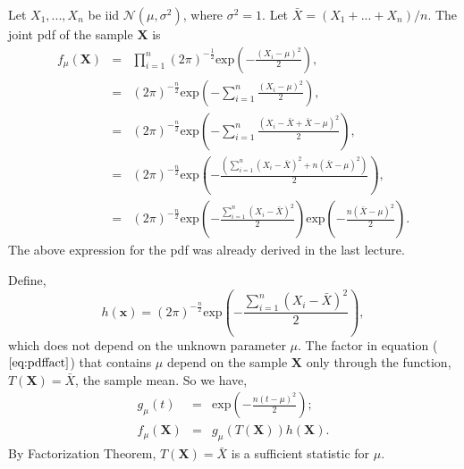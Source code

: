 \documentclass[a4paper,english,12pt]{article}
\newcommand{\bx}{\mathbf{x}}
\newcommand{\bX}{\mathbf{X}}
\begin{document}
\begin{exmp} 
 \label{ex:norml}
Let $X_1,...,X_n$ be iid $\mathcal{N}(\mu, \sigma^2)$, where $\sigma^2=1$. Let $\bar{X}=(X_1+...+X_n)/n$. The joint pdf of the sample $\bX$ is
\begin{eqnarray}
f_\mu(\bX) &=& \prod_{i=1}^{n}{(2\pi)^{-\frac{1}{2}} \text{exp}\left(-\frac{(X_i-\mu)^2}{2}\right)}, \nonumber \\
&=& (2\pi)^{-\frac{n}{2}}\text{exp}\left(-\sum_{i=1}^{n}{\frac{(X_i-\mu)^2}{2}}\right), \nonumber \\
&=& (2\pi)^{-\frac{n}{2}}\text{exp}\left(-\sum_{i=1}^{n}{\frac{(X_i-\bar{X}+\bar{X}-\mu)^2}{2}}\right), \nonumber \\
&=& (2\pi)^{-\frac{n}{2}}\text{exp}\left(-\frac{\left(\sum_{i=1}^{n}{(X_i-\bar{X})^2}+n(\bar{X}-\mu)^2\right)}{2}\right), \nonumber \\
&=& (2\pi)^{-\frac{n}{2}}\text{exp}\left(-\frac{\sum_{i=1}^{n}{(X_i-\bar{X})^2}}{2}\right)\text{exp}\left(-\frac{n(\bar{X}-\mu)^2}{2}\right). \label{eq:pdffact}
\end{eqnarray}
The above expression for the pdf was already derived in the last lecture. 
\par Define,
\begin{equation*}
h(\bx)=(2\pi)^{-\frac{n}{2}}\text{exp}\left(-\frac{\sum_{i=1}^{n}{(X_i-\bar{X})^2}}{2}\right),
\end{equation*}
which does not depend on the unknown parameter $\mu$. The factor in equation ($\ref{eq:pdffact}$) that contains $\mu$ depend on the sample $\bX$ only through the function, $T(\bX)=\bar{X}$, the sample mean. So we have, 
\begin{eqnarray}
g_\mu(t) &=& \text{exp}\left(-\frac{n(t-\mu)^2}{2}\right); \\
f_\mu(\bX)&=& g_\mu(T(\bX))h(\bX).
\end{eqnarray}
By Factorization Theorem, $T(\bX)=\bar{X}$ is a sufficient statistic for $\mu$.
\end{exmp}
\end{document}
